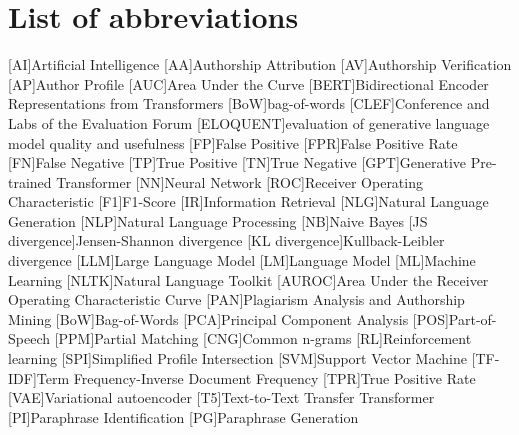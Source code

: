 \chapter*{List of abbreviations}

\begin{acronym}[XXXXXXXXX]
    [AI]{Artificial Intelligence}
    [AA]{Authorship Attribution}
    [AV]{Authorship Verification}
    [AP]{Author Profile}
    [AUC]{Area Under the Curve}
    [BERT]{Bidirectional Encoder Representations from Transformers}
    [BoW]{bag-of-words}
    [CLEF]{Conference and Labs of the Evaluation Forum}
    [ELOQUENT]{evaluation of generative language model quality and usefulness}
    [FP]{False Positive}
    [FPR]{False Positive Rate}
    [FN]{False Negative}
    [TP]{True Positive}
    [TN]{True Negative}
    [GPT]{Generative Pre-trained Transformer}
    [NN]{Neural Network}
    [ROC]{Receiver Operating Characteristic}
    [F1]{F1-Score}
    [IR]{Information Retrieval}
    [NLG]{Natural Language Generation}
    [NLP]{Natural Language Processing}
    [NB]{Naive Bayes}
    [JS divergence]{Jensen-Shannon divergence}
    [KL divergence]{Kullback-Leibler divergence}
    [LLM]{Large Language Model}
    [LM]{Language Model}
    [ML]{Machine Learning}
    [NLTK]{Natural Language Toolkit}
    [AUROC]{Area Under the Receiver Operating Characteristic Curve}
    [PAN]{Plagiarism Analysis and Authorship Mining} %
    [BoW]{Bag-of-Words}
    [PCA]{Principal Component Analysis}
    [POS]{Part-of-Speech}
    [PPM]{Partial Matching}
    [CNG]{Common n-grams}
    [RL]{Reinforcement learning}
    [SPI]{Simplified Profile Intersection}
    [SVM]{Support Vector Machine}
    [TF-IDF]{Term Frequency-Inverse Document Frequency}
    [TPR]{True Positive Rate}
    [VAE]{Variational autoencoder}
    [T5]{Text-to-Text Transfer Transformer}
    [PI]{Paraphrase Identification}
    [PG]{Paraphrase Generation}

\end{acronym}
